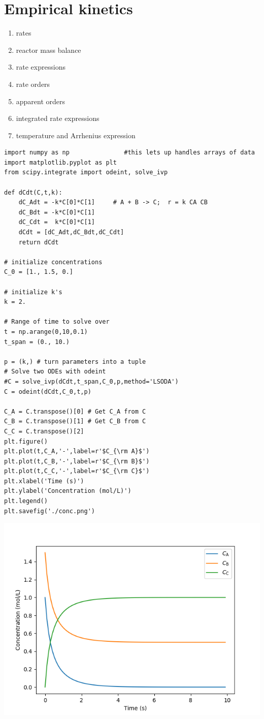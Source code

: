 \documentclass[11pt]{article}
\begin{document}
\section{Empirical kinetics}
\label{sec:org44c9d61}
\begin{enumerate}
\item rates
\item reactor mass balance
\item rate expressions
\item rate orders
\item apparent orders
\item integrated rate expressions
\item temperature and Arrhenius expression
\end{enumerate}

\begin{verbatim}
import numpy as np               #this lets up handles arrays of data
import matplotlib.pyplot as plt
from scipy.integrate import odeint, solve_ivp

def dCdt(C,t,k):
    dC_Adt = -k*C[0]*C[1]     # A + B -> C;  r = k CA CB
    dC_Bdt = -k*C[0]*C[1]
    dC_Cdt =  k*C[0]*C[1]
    dCdt = [dC_Adt,dC_Bdt,dC_Cdt] 
    return dCdt

# initialize concentrations
C_0 = [1., 1.5, 0.]

# initialize k's
k = 2.

# Range of time to solve over
t = np.arange(0,10,0.1) 
t_span = (0., 10.)

p = (k,) # turn parameters into a tuple
# Solve two ODEs with odeint
#C = solve_ivp(dCdt,t_span,C_0,p,method='LSODA')
C = odeint(dCdt,C_0,t,p)

C_A = C.transpose()[0] # Get C_A from C
C_B = C.transpose()[1] # Get C_B from C
C_C = C.transpose()[2]
plt.figure()
plt.plot(t,C_A,'-',label=r'$C_{\rm A}$')
plt.plot(t,C_B,'-',label=r'$C_{\rm B}$')
plt.plot(t,C_C,'-',label=r'$C_{\rm C}$')
plt.xlabel('Time (s)')
plt.ylabel('Concentration (mol/L)')
plt.legend()
plt.savefig('./conc.png')
\end{verbatim}

\begin{center}
\includegraphics[width=.9\linewidth]{./conc.png}
\end{center}
\end{document}
